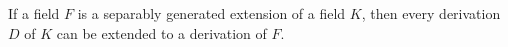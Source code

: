 If a field $F$ is a separably generated extension of a field $K$, then every derivation $D$ of $K$ can be extended to a derivation of $F$.
